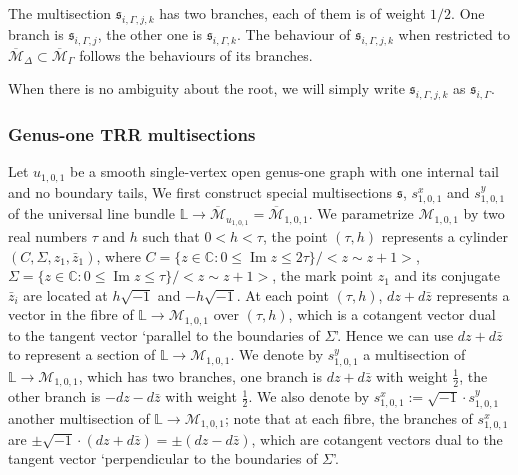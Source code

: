\documentclass[11pt]{amsart}
\theoremstyle{definition}
\theoremstyle{remark}
\newcommand{\<}{\left<}
\renewcommand{\>}{\right>}
\numberwithin{equation}{section}
\def\Mbar{{\overline{\mathcal M}}}
\begin{document}
The multisection $\mathfrak s_{i,\Gamma,j,k}$ has two branches, each of them is of weight $1/2$. One branch is $\mathfrak s_{i,\Gamma,j}$, the other one is $\mathfrak s_{i,\Gamma,k}$. The behaviour of  $\mathfrak s_{i,\Gamma,j,k}$ when restricted to $\Mbar_{\Delta}\subset \Mbar_{\Gamma}$ follows the behaviours of its branches.

When there is no ambiguity about the root, we will simply write $\mathfrak s_{i,\Gamma,j,k}$ as $\mathfrak s_{i,\Gamma}$.

\subsubsection{Genus-one TRR multisections}\label{sec basic trr section}
Let $u_{1,0,1}$ be a smooth single-vertex open genus-one graph with one internal tail and no boundary tails, We first construct special multisections $\mathfrak s$, $s^x_{1,0,1}$ and $s^y_{1,0,1}$ of the universal line bundle $\mathbb L\to \Mbar_{u_{1,0,1}} =\Mbar_{1,0,1}$. We parametrize $\mathcal M_{1,0,1}$ by two real numbers $\tau$ and  $h$ such that $0<h<\tau$, the point $(\tau,h)$ represents a cylinder $(C,\Sigma,z_1,\bar z_1)$, where $C=\{z\in \mathbb C\colon 0\le \operatorname{Im} z\le 2\tau\}/<z \sim z+1>$, $\Sigma=\{z\in \mathbb C\colon 0\le \operatorname{Im} z\le \tau\}/<z \sim z+1>$, the mark point $z_1$ and its conjugate $\bar z_i$ are located at $h\sqrt{-1}$ and $-h\sqrt{-1}$. At each point $(\tau,h)$, $dz+d\bar z$ represents a vector in the fibre of $\mathbb L \to \mathcal M_{1,0,1}$ over $(\tau,h)$, which is a cotangent vector dual to the tangent vector `parallel to the boundaries of $\Sigma$'. Hence we can use $dz+d\bar z$ to represent a section of $\mathbb L \to \mathcal M_{1,0,1}$.  We denote by $s^y_{1,0,1}$ a multisection of $\mathbb L \to \mathcal M_{1,0,1}$, which has two branches, one branch is $dz+d\bar z$ with weight $\frac{1}{2}$, the other branch is $-dz-d\bar z$ with weight $\frac{1}{2}$. We also denote by $s^x_{1,0,1}:=\sqrt{-1}\cdot s^y_{1,0,1}$ another multisection of $\mathbb L \to \mathcal M_{1,0,1}$; note that at each fibre, the branches of $s^x_{1,0,1}$ are $\pm \sqrt{-1}\cdot (dz+d\bar z)=\pm (dz-d\bar z)$, which are cotangent vectors dual to the tangent vector `perpendicular to the boundaries of $\Sigma$'.
\end{document}
